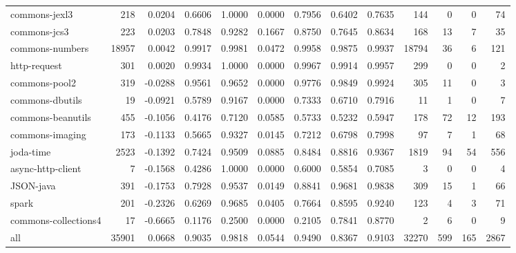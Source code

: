 \begin{table*}
\begin{tabular}{lrrrrrrrrrrrr}
          commons-jexl3 &    218 &      0.0204 &  0.6606 &     1.0000 &     0.0000 &  0.7956 &     0.6402 &   0.7635 &    144 &    0 &    0 &    74 \\
           commons-jcs3 &    223 &      0.0203 &  0.7848 &     0.9282 &     0.1667 &  0.8750 &     0.7645 &   0.8634 &    168 &   13 &    7 &    35 \\
        commons-numbers &  18957 &      0.0042 &  0.9917 &     0.9981 &     0.0472 &  0.9958 &     0.9875 &   0.9937 &  18794 &   36 &    6 &   121 \\
           http-request &    301 &      0.0020 &  0.9934 &     1.0000 &     0.0000 &  0.9967 &     0.9914 &   0.9957 &    299 &    0 &    0 &     2 \\
          commons-pool2 &    319 &     -0.0288 &  0.9561 &     0.9652 &     0.0000 &  0.9776 &     0.9849 &   0.9924 &    305 &   11 &    0 &     3 \\
        commons-dbutils &     19 &     -0.0921 &  0.5789 &     0.9167 &     0.0000 &  0.7333 &     0.6710 &   0.7916 &     11 &    1 &    0 &     7 \\
      commons-beanutils &    455 &     -0.1056 &  0.4176 &     0.7120 &     0.0585 &  0.5733 &     0.5232 &   0.5947 &    178 &   72 &   12 &   193 \\
        commons-imaging &    173 &     -0.1133 &  0.5665 &     0.9327 &     0.0145 &  0.7212 &     0.6798 &   0.7998 &     97 &    7 &    1 &    68 \\
              joda-time &   2523 &     -0.1392 &  0.7424 &     0.9509 &     0.0885 &  0.8484 &     0.8816 &   0.9367 &   1819 &   94 &   54 &   556 \\
      async-http-client &      7 &     -0.1568 &  0.4286 &     1.0000 &     0.0000 &  0.6000 &     0.5854 &   0.7085 &      3 &    0 &    0 &     4 \\
              JSON-java &    391 &     -0.1753 &  0.7928 &     0.9537 &     0.0149 &  0.8841 &     0.9681 &   0.9838 &    309 &   15 &    1 &    66 \\
                  spark &    201 &     -0.2326 &  0.6269 &     0.9685 &     0.0405 &  0.7664 &     0.8595 &   0.9240 &    123 &    4 &    3 &    71 \\
   commons-collections4 &     17 &     -0.6665 &  0.1176 &     0.2500 &     0.0000 &  0.2105 &     0.7841 &   0.8770 &      2 &    6 &    0 &     9 \\
                    all &  35901 &      0.0668 &  0.9035 &     0.9818 &     0.0544 &  0.9490 &     0.8367 &   0.9103 &  32270 &  599 &  165 &  2867 \\
\bottomrule
\end{tabular}
\end{table*}

